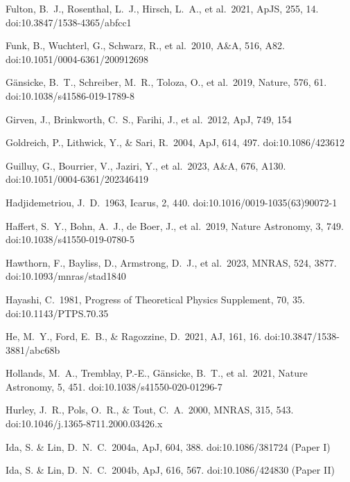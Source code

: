 \documentclass[useAMS,usenatbib]{mn2e}
\begin{document}
\begin{thebibliography}{99}
 Fulton, B.~J., Rosenthal, L.~J., Hirsch, L.~A., et al.\ 2021, ApJS, 255, 14. doi:10.3847/1538-4365/abfcc1

 Funk, B., Wuchterl, G., Schwarz, R., et al.\ 2010, A\&A, 516, A82. doi:10.1051/0004-6361/200912698

 G{\"a}nsicke, B.~T., Schreiber, M.~R., Toloza, O., et al.\ 2019, Nature, 576, 61. doi:10.1038/s41586-019-1789-8

 Girven, J., Brinkworth, C.~S., Farihi, J., et al.\ 2012, ApJ, 749, 154

 Goldreich, P., Lithwick, Y., \& Sari, R.\ 2004, ApJ, 614, 497. doi:10.1086/423612

 Guilluy, G., Bourrier, V., Jaziri, Y., et al.\ 2023, A\&A, 676, A130. doi:10.1051/0004-6361/202346419

 Hadjidemetriou, J.~D.\ 1963, Icarus, 2, 440. doi:10.1016/0019-1035(63)90072-1

 Haffert, S.~Y., Bohn, A.~J., de Boer, J., et al.\ 2019, Nature Astronomy, 3, 749. doi:10.1038/s41550-019-0780-5

 Hawthorn, F., Bayliss, D., Armstrong, D.~J., et al.\ 2023, MNRAS, 524, 3877. doi:10.1093/mnras/stad1840

 Hayashi, C.\ 1981, Progress of Theoretical Physics Supplement, 70, 35. doi:10.1143/PTPS.70.35

 He, M.~Y., Ford, E.~B., \& Ragozzine, D.\ 2021, AJ, 161, 16. doi:10.3847/1538-3881/abc68b

 Hollands, M.~A., Tremblay, P.-E., G{\"a}nsicke, B.~T., et al.\ 2021, Nature Astronomy, 5, 451. doi:10.1038/s41550-020-01296-7

 Hurley, J.~R., Pols, O.~R., \& Tout, C.~A.\ 2000, MNRAS, 315, 543. doi:10.1046/j.1365-8711.2000.03426.x

 Ida, S. \& Lin, D.~N.~C.\ 2004a, ApJ, 604, 388. doi:10.1086/381724 (Paper I)

 Ida, S. \& Lin, D.~N.~C.\ 2004b, ApJ, 616, 567. doi:10.1086/424830 (Paper II)


\end{thebibliography}
\end{document}
